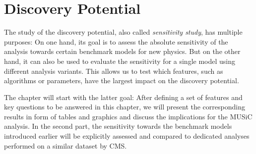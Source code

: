 
\newcommand{\lumiA}{\SI{2.3}{\per\femto\barn}}
\newcommand{\lumiB}{\SI{35.9}{\per\femto\barn}}

\chapter{Discovery Potential}
\label{chap:sensitivity_studies}

The study of the discovery potential, also called \emph{sensitivity study}, has multiple purposes: On one hand, its goal is to assess the absolute sensitivity of the analysis towards certain benchmark models for new physics. But on the other hand, it can also be used to evaluate the sensitivity for a single model using different analysis variants. This allows us to test which features, such as algorithms or parameters, have the largest impact on the discovery potential.

The chapter will start with the latter goal: After defining a set of features and key questions to be answered in this chapter, we will present the corresponding results in form of tables and graphics and discuss the implications for the \ac{MUSiC} analysis. 
In the second part, the sensitivity towards the benchmark models introduced earlier will be explicitly assessed and compared to dedicated analyses performed on a similar dataset by \ac{CMS}.


